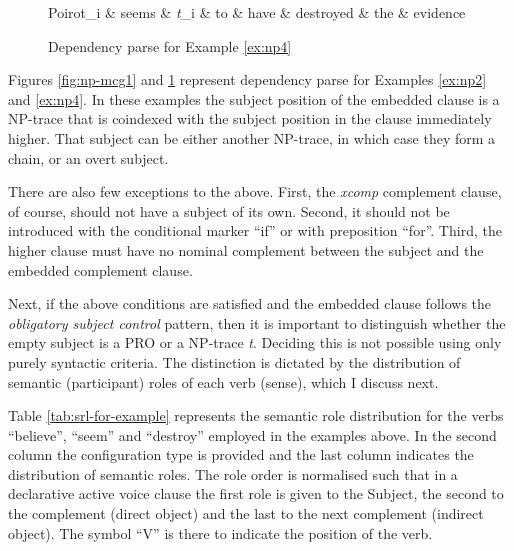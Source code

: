     \begin{figure}[!ht]
        \centering
        \begin{dependency}
            \begin{deptext}[]
                Poirot_i \& seems \& \textit{t}_i \& to \& have \& destroyed \& the \& evidence \\
            \end{deptext}
        \end{dependency}
        \caption{Dependency parse for Example \ref{ex:np4}}
        \label{fig:np-mcg2} 
    \end{figure}

    Figures \ref{fig:np-mcg1} and \ref{fig:np-mcg2} represent dependency parse for Examples \ref{ex:np2} and \ref{ex:np4}. In these examples the subject position of the embedded clause is a NP-trace that is coindexed with the subject position in the  clause immediately higher. That subject can be either another NP-trace, in which case they form a chain, or an overt subject. 

    There are also few exceptions to the above. First, the \textit{xcomp} complement clause, of course, should not have a subject of its own. Second, it should not be introduced with the conditional marker ``if'' or with preposition ``for''. Third, the higher clause must have no nominal complement between the subject and the embedded complement clause. 

    Next, if the above conditions are satisfied and the embedded clause follows the \textit{obligatory subject control} pattern, then it is important to distinguish whether the empty subject is a PRO or a NP-trace \textit{t}. Deciding this is not possible using only purely syntactic criteria. The distinction is dictated by the distribution of semantic (participant) roles of each verb (sense), which I discuss next.

    Table \ref{tab:srl-for-example} represents the semantic role distribution for the verbs ``believe'', ``seem'' and ``destroy'' employed in the examples above. In the second column the configuration type is provided and the last column indicates the distribution of semantic roles. The role order is normalised such that in a declarative active voice clause the first role is given to the Subject, the second to the complement (direct object) and the last to the next complement (indirect object). The symbol ``V'' is there to indicate the position of the verb. 

